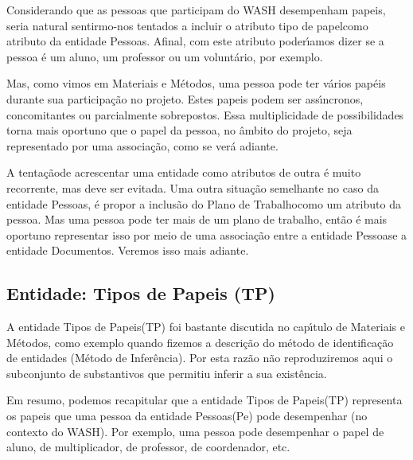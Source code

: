 \documentclass[
12pt,		%
openright,	%
twoside,  %
a4paper,			%
chapter=TITLE,		%
english,			%
french,				%
spanish,			%
brazil				%
]{USPSC-classe/USPSC}
\begin{document}
Considerando que as pessoas que participam do WASH desempenham \textquotedbl papeis\textquotedbl , seria natural sentirmo-nos tentados a incluir o atributo \textquotedbl tipo de papel\textquotedbl  como atributo da entidade \textquotedbl Pessoas\textquotedbl . Afinal, com este atributo poder\'{\i}amos dizer se a pessoa \'e um aluno, um professor ou um volunt\'ario, por exemplo.




Mas, como vimos em Materiais e M\'etodos, uma pessoa pode ter v\'arios pap\'eis durante sua participa\c{c}\~ao no projeto. Estes papeis podem ser ass\'{\i}ncronos, concomitantes ou parcialmente sobrepostos. Essa multiplicidade de possibilidades torna mais oportuno que  o papel da pessoa, no \^ambito do projeto, seja representado por uma associa\c{c}\~ao, como se ver\'a adiante.




A \textquotedbl tenta\c{c}\~ao\textquotedbl  de acrescentar uma entidade como atributos de outra \'e muito recorrente, mas deve ser evitada. Uma outra situa\c{c}\~ao semelhante no caso da entidade \textquotedbl Pessoas\textquotedbl , \'e propor a inclus\~ao do \textquotedbl Plano de Trabalho\textquotedbl  como um atributo da pessoa. Mas uma pessoa pode ter mais de um plano de trabalho, ent\~ao \'e mais oportuno representar isso por meio de uma associa\c{c}\~ao entre a entidade \textquotedbl Pessoas\textquotedbl  e a entidade \textquotedbl Documentos\textquotedbl . Veremos isso mais adiante.




\subsection[Entidade: Tipos de Papeis (TP)]{Entidade: Tipos de Papeis (TP)}\label{Entidade: Tipos de Papeis (TP)}
A entidade \textquotedbl Tipos de Papeis\textquotedbl  (TP) foi bastante discutida no cap\'{\i}tulo de Materiais e M\'etodos, como exemplo quando fizemos a descri\c{c}\~ao do m\'etodo de identifica\c{c}\~ao de entidades (\textquotedbl M\'etodo de Infer\^encia\textquotedbl ). Por esta raz\~ao n\~ao reproduziremos aqui o subconjunto de substantivos que permitiu inferir a sua exist\^encia.




Em resumo, podemos recapitular que a entidade \textquotedbl Tipos de Papeis\textquotedbl  (TP) representa os papeis que uma pessoa da entidade \textquotedbl Pessoas\textquotedbl  (Pe) pode desempenhar (no contexto do WASH). Por exemplo, uma pessoa pode desempenhar o papel de aluno, de multiplicador, de professor, de coordenador, etc.
\end{document}
